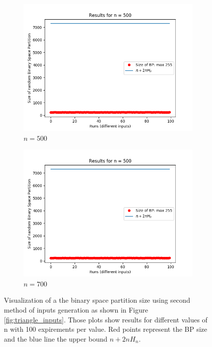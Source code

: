 \documentclass[letterpaper]{article}
\begin{document}
\begin{figure}[H]
\begin{subfigure}{.33\textwidth}
      \includegraphics[width=1\linewidth]{images/assign1/triangle/inputs_500}
      \caption{$n = 500$}
    \end{subfigure}
    \begin{subfigure}{.33\textwidth}
      \centering
      \includegraphics[width=1\linewidth]{images/assign1/triangle/inputs_500}
      \caption{$n = 700$}
    \end{subfigure}
    \caption{Visualization of a the binary space partition size using
    second method of inputs generation as shown in Figure \ref{fig:triangle_inputs}.
    Those plots show results for
    different values of n with 100 expirements per value. Red points represent
    the BP size and the blue line the upper bound $n + 2nH_n$.}
    \label{fig:expirements_triangle}
\end{figure}
\end{document}
